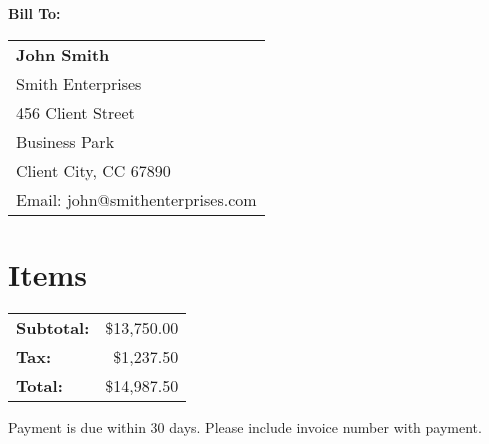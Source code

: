 \documentclass[a4paper,11pt]{article}
\begin{document}
\vspace{0.5cm}

\textbf{Bill To:}

\begin{tabular}{@{}l@{}}
    
    \textbf{John Smith} \\
    
    
    Smith Enterprises \\
    
    
    456 Client Street\\Business Park\\Client City, CC 67890 \\
    
    
    
    Email: john@smithenterprises.com \\
    
\end{tabular} 

\vspace{1cm}

\section{Items}

\vspace{0.5cm}

\begin{flushright}
    \begin{tabular}{lr}
        \textbf{Subtotal:} & \$13,750.00 \\
        \textbf{Tax:} & \$1,237.50 \\
        \hline
        \textbf{Total:} & \$14,987.50 \\
    \end{tabular}
\end{flushright}

\vspace{1cm}


\begin{tcolorbox}[
    colback=blue!5!white,
    colframe=blue!75!black,
    title=Payment Terms,
    fonttitle=\bfseries
]
Payment is due within 30 days. Please include invoice number with payment.
\end{tcolorbox} 
\end{document}
